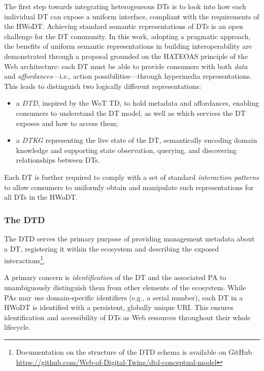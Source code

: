 The first step towards integrating heterogeneous \acp{DT} is to look into how each individual \ac{DT} can expose a uniform interface, compliant with the requirements of the \ac{HWoDT}.
Achieving standard semantic representations of \acp{DT} is an open challenge for the \ac{DT} community.
%
In this work, adopting a pragmatic approach, the benefits of uniform semantic representations in building interoperability are demonstrated through a proposal grounded on the \ac{HATEOAS} principle of the Web architecture:
each \ac{DT} must be able to provide consumers with both \emph{data} and \emph{affordances}---i.e., action possibilities---through hypermedia representations.
This leads to distinguish two logically different representations:
\begin{itemize}
    \item a \emph{\acf{DTD}}, inspired by the \ac{WoT} \acl{TD}, to hold metadata and affordances, enabling consumers to understand the \ac{DT} model, as well as which services the \ac{DT} exposes and how to access them;
    \item a \emph{\acf{DTKG}} representing the live state of the \ac{DT}, semantically encoding domain knowledge and supporting state observation, querying, and discovering relationships between \acp{DT}.
\end{itemize}

Each \ac{DT} is further required to comply with a set of standard \emph{interaction patterns} to allow consumers to uniformly obtain and manipulate such representations for all \acp{DT} in the \ac{HWoDT}.

\subsubsection{The \acl{DTD}}

The \ac{DTD} serves the primary purpose of providing management metadata about a \ac{DT}, registering it within the ecosystem and describing the exposed interactions\footnote{Documentation on the structure of the \ac{DTD} schema is available on GitHub \url{https://github.com/Web-of-Digital-Twins/dtd-conceptual-model}}.

A primary concern is \emph{identification} of the \ac{DT} and the associated \ac{PA} to unambiguously distinguish them from other elements of the ecosystem.
While \acp{PA} may use domain-specific identifiers (e.g., a serial number), each \ac{DT} in a \ac{HWoDT} is identified with a persistent, globally unique \ac{URI}.
This ensures identification and accessibility of \acp{DT} as Web resources throughout their whole lifecycle.

